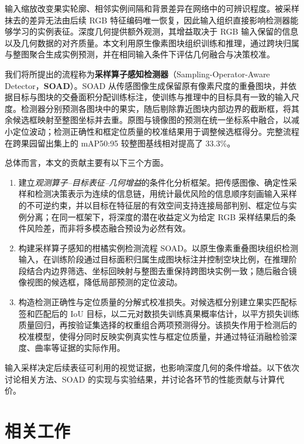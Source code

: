 \documentclass[11pt,a4paper]{ctexart}
\begin{document}
输入缩放改变果实轮廓、相邻实例间隔和背景差异在网络中的可辨识程度。被采样抹去的差异无法由后续 RGB 特征编码唯一恢复，因此输入组织直接影响检测器能够学习的实例表征。深度几何提供额外观测，其增益取决于 RGB 输入保留的信息以及几何数据的对齐质量。本文利用原生像素图块组织训练和推理，通过跨块归属与整图聚合生成实例预测，并在相同输入条件下评估几何融合与决策校准。

我们将所提出的流程称为\textbf{采样算子感知检测器}（Sampling-Operator-Aware Detector，\textbf{SOAD}）。SOAD 从传感图像生成保留原有像素尺度的重叠图块，并依据目标与图块的交叠面积分配训练标注，使训练与推理中的目标具有一致的输入尺度。检测器分别预测各图块中的果实，随后剔除靠近图块内部边界的截断框，将其余候选框映射至整图坐标并去重。原图与镜像图的预测在统一坐标系中融合，以减小定位波动；检测正确性和框定位质量的校准结果用于调整候选框得分。完整流程在跨果园留出集上的 mAP50:95 较整图基线相对提高了 33.3\%。

总体而言，本文的贡献主要有以下三个方面。
\begin{enumerate}
\item 建立\emph{观测算子--目标表征--几何增益}的条件化分析框架。把传感图像、确定性采样和检测决策表示为连续的信息链，用统计最优风险的信息顺序刻画输入采样的不可逆约束，并以目标在特征层的有效空间支持连接局部判别、框定位与实例分离；在同一框架下，将深度的潜在收益定义为给定 RGB 采样结果后的条件风险差，而非将多模态融合预设为必然有效。
\item 构建采样算子感知的柑橘实例检测流程 SOAD。以原生像素重叠图块组织检测输入，在训练阶段通过目标面积归属生成图块标注并控制空块比例，在推理阶段结合内边界筛选、坐标回映射与整图去重保持跨图块实例一致；随后融合镜像视图的候选框，降低局部预测的定位波动。
\item 构造检测正确性与定位质量的分解式校准损失。对候选框分别建立果实匹配标签和匹配后的 IoU 目标，以二元对数损失训练真果概率估计，以平方损失训练质量回归，再按验证集选择的权重组合两项预测得分。该损失作用于检测后的校准模型，使得分同时反映实例真实性与框定位质量，并通过特征消融检验深度、曲率等证据的实际作用。
\end{enumerate}

输入采样决定后续表征可利用的视觉证据，也影响深度几何的条件增益。以下依次讨论相关方法、SOAD 的实现与实验结果，并讨论各环节的性能贡献与计算代价。

\section{相关工作}
\end{document}
